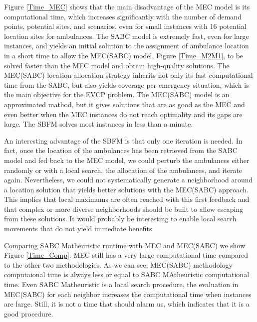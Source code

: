 Figure \ref{Time_MEC} shows that the main disadvantage of the MEC model is its com\-pu\-ta\-tio\-nal time, which increases significantly with the number of demand points, potential sites, and scenarios, even for small instances with 16 potential location sites for ambulances. The SABC model is extremely fast, even for large instances, and yields an initial solution to the assignment of ambulance location in a short time to allow the MEC(SABC) model, Figure \ref{Time_M2M1}, to be solved faster than the MEC model and obtain high-quality solutions. The MEC(SABC) location-allocation strategy inherits not only its fast computational time from the SABC, but also yields coverage per emergency situation, which is the main objective for the EVCP problem. The MEC(SABC) model is an approximated mathod, but it gives solutions that are as good as the MEC and even better when the MEC instances do not reach optimality and its gaps are large. The SBFM solves most instances in less than a minute.  

An interesting advantage of the SBFM is that only one iteration is needed. In fact, once the location of the ambulances has been retrieved from the SABC model and fed back to the MEC model, we could perturb the ambulances either randomly or with a local search, the allocation of the ambulances, and iterate again. Nevertheless, we could not systematically generate a neighborhood around a location solution that yields better solutions with the MEC(SABC) approach. This implies that local maximums are often reached with this first feedback and that complex or more diverse neighborhoods should be built to allow escaping from these solutions. It would probably be interesting to enable local search movements that do not yield immediate benefits.  

Comparing SABC Matheuristic runtime with MEC and MEC(SABC) we show Figure \ref{Time_Comp}. MEC still has a very large computational time compared to the other two methodologies. As we can see, MEC(SABC) methodology computaional time is always less or equal to SABC MAtheuristic computational time. Even SABC Matheuristic is a local search procedure, the evaluation in MEC(SABC) for each neighbor increases the computational time when instances are large. Still, it is not a time that should alarm us, which indicates that it is a good procedure.


